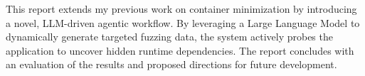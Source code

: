 This report extends my previous work on container minimization by introducing a novel, 
LLM-driven agentic workflow. By leveraging a Large Language Model to dynamically generate 
targeted fuzzing data, the system actively probes the application to uncover hidden runtime 
dependencies. The report concludes with an evaluation of the results and proposed directions 
for future development.
